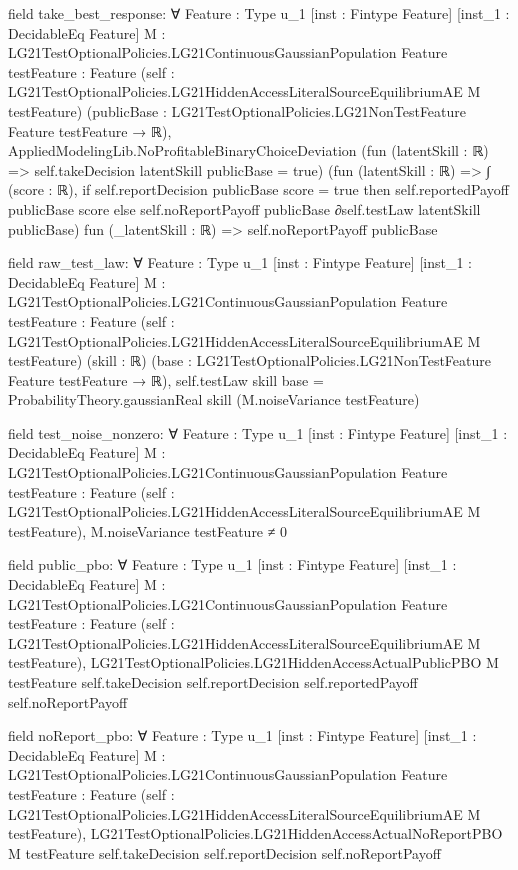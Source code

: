 \documentclass[10pt]{article}
\begin{document}
\begin{ReviewVerbatim}
field take_best_response:
∀ {Feature : Type u_1} [inst : Fintype Feature] [inst_1 : DecidableEq Feature]
  {M : LG21TestOptionalPolicies.LG21ContinuousGaussianPopulation Feature} {testFeature : Feature}
  (self : LG21TestOptionalPolicies.LG21HiddenAccessLiteralSourceEquilibriumAE M testFeature)
  (publicBase : LG21TestOptionalPolicies.LG21NonTestFeature Feature testFeature → ℝ),
  AppliedModelingLib.NoProfitableBinaryChoiceDeviation
    (fun (latentSkill : ℝ) => self.takeDecision latentSkill publicBase = true)
    (fun (latentSkill : ℝ) =>
      ∫ (score : ℝ),
        if self.reportDecision publicBase score = true then self.reportedPayoff publicBase score
        else self.noReportPayoff publicBase ∂self.testLaw latentSkill publicBase)
    fun (_latentSkill : ℝ) => self.noReportPayoff publicBase

field raw_test_law:
∀ {Feature : Type u_1} [inst : Fintype Feature] [inst_1 : DecidableEq Feature]
  {M : LG21TestOptionalPolicies.LG21ContinuousGaussianPopulation Feature} {testFeature : Feature}
  (self : LG21TestOptionalPolicies.LG21HiddenAccessLiteralSourceEquilibriumAE M testFeature) (skill : ℝ)
  (base : LG21TestOptionalPolicies.LG21NonTestFeature Feature testFeature → ℝ),
  self.testLaw skill base = ProbabilityTheory.gaussianReal skill (M.noiseVariance testFeature)

field test_noise_nonzero:
∀ {Feature : Type u_1} [inst : Fintype Feature] [inst_1 : DecidableEq Feature]
  {M : LG21TestOptionalPolicies.LG21ContinuousGaussianPopulation Feature} {testFeature : Feature}
  (self : LG21TestOptionalPolicies.LG21HiddenAccessLiteralSourceEquilibriumAE M testFeature),
  M.noiseVariance testFeature ≠ 0

field public_pbo:
∀ {Feature : Type u_1} [inst : Fintype Feature] [inst_1 : DecidableEq Feature]
  {M : LG21TestOptionalPolicies.LG21ContinuousGaussianPopulation Feature} {testFeature : Feature}
  (self : LG21TestOptionalPolicies.LG21HiddenAccessLiteralSourceEquilibriumAE M testFeature),
  LG21TestOptionalPolicies.LG21HiddenAccessActualPublicPBO M testFeature self.takeDecision self.reportDecision
    self.reportedPayoff self.noReportPayoff

field noReport_pbo:
∀ {Feature : Type u_1} [inst : Fintype Feature] [inst_1 : DecidableEq Feature]
  {M : LG21TestOptionalPolicies.LG21ContinuousGaussianPopulation Feature} {testFeature : Feature}
  (self : LG21TestOptionalPolicies.LG21HiddenAccessLiteralSourceEquilibriumAE M testFeature),
  LG21TestOptionalPolicies.LG21HiddenAccessActualNoReportPBO M testFeature self.takeDecision self.reportDecision
    self.noReportPayoff
\end{ReviewVerbatim}
\end{document}
